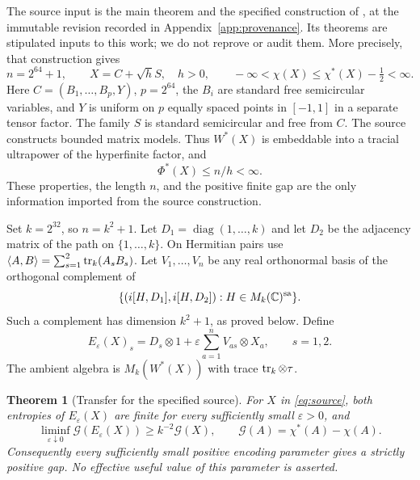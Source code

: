 \documentclass[11pt]{article}
\newtheorem{theorem}{Theorem}[section]
\theoremstyle{definition}\newtheorem{definition}[theorem]{Definition}
\theoremstyle{remark}\newtheorem{remark}[theorem]{Remark}
\newcommand{\C}{\mathbb C}\newcommand{\R}{\mathbb R}
\newcommand{\eps}{\varepsilon}\newcommand{\id}{\mathrm{id}}
\newcommand{\gap}{\mathcal G}\newcommand{\Enc}{E_{\eps}}
\begin{document}
The source input is the main theorem and the specified construction of
\cite{source298}, at the immutable revision recorded in
Appendix~\ref{app:provenance}. Its theorems are stipulated inputs to this
work; we do not reprove or audit them. More precisely, that construction
gives
\begin{equation}\label{eq:source}
 n=2^{64}+1,\qquad X=C+\sqrt h S,\quad h>0,\qquad
 -\infty<\chi(X)\leq\chi^*(X)-\tfrac12<\infty.
\end{equation}
Here $C=(B_1,\ldots,B_p,Y)$, $p=2^{64}$, the $B_i$ are standard free
semicircular variables, and $Y$ is uniform on $p$ equally spaced points
in $[-1,1]$ in a separate tensor factor. The family $S$ is standard
semicircular and free from $C$. The source constructs bounded matrix
models. Thus $W^*(X)$ is embeddable into a tracial ultrapower of the
hyperfinite factor, and
\begin{equation}\label{eq:finite-fisher-source}
 \Phi^*(X)\leq n/h<\infty.
\end{equation}
These properties, the length $n$, and the positive finite gap are the
only information imported from the source construction.

Set $k=2^{32}$, so $n=k^2+1$. Let $D_1=\operatorname{diag}(1,\ldots,k)$
and let $D_2$ be the adjacency matrix of the path on $\{1,\ldots,k\}$.
On Hermitian pairs use $\langle A,B\rangle=\sum_{s=1}^2\operatorname{tr}_k(A_sB_s)$.
Let $V_1,\ldots,V_n$ be any real orthonormal basis of the orthogonal
complement of
\[
 \{(i[H,D_1],i[H,D_2]):H\in M_k(\C)^{\sa}\}.
\]
Such a complement has dimension $k^2+1$, as proved below. Define
\begin{equation}\label{eq:encoding}
 E_\eps(X)_s=D_s\otimes1+\eps\sum_{a=1}^n V_{as}\otimes X_a,
 \qquad s=1,2.
\end{equation}
The ambient algebra is $M_k(W^*(X))$ with trace $\operatorname{tr}_k\otimes\tau$.

\begin{theorem}[Transfer for the specified source]\label{thm:transfer}
For $X$ in \eqref{eq:source}, both entropies of $E_\eps(X)$ are finite
for every sufficiently small $\eps>0$, and
\begin{equation}\label{eq:transfer}
 \liminf_{\eps\downarrow0}\gap(E_\eps(X))\geq k^{-2}\gap(X),
 \qquad \gap(A)=\chi^*(A)-\chi(A).
\end{equation}
Consequently every sufficiently small positive encoding parameter gives
a strictly positive gap. No effective useful value of this parameter
is asserted.
\end{theorem}
\end{document}
